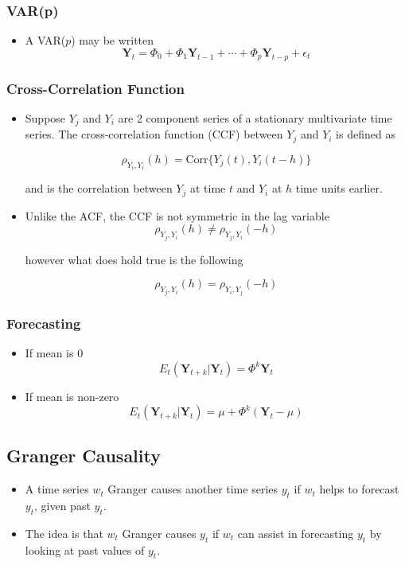 \documentclass[11pt]{article}
\begin{document}
\subsubsection{VAR(p)}
\begin{itemize}
    \item A VAR($p$) may be written 
    \[ 
    \boldsymbol{Y}_t = \Phi_0 + \Phi_1 \boldsymbol{Y}_{t-1} + \cdots + \Phi_p 
    \boldsymbol{Y}_{t-p} + \epsilon_t 
    \]
\end{itemize}

\subsubsection{Cross-Correlation Function}
\begin{itemize}
    \item Suppose $Y_j$ and $Y_i$ are 2 component series of a stationary multivariate time 
    series. The cross-correlation function (CCF) between $Y_j$ and $Y_i$ is defined as 

    \[ \rho_{Y_i, Y_i}(h) = \text{Corr}\{Y_j(t), Y_i(t-h)\} \]

    and is the correlation between $Y_j$ at time $t$ and $Y_i$ at $h$ time units earlier. 
    \item Unlike the ACF, the CCF is not symmetric in the lag variable 
    \[ \rho_{Y_j, Y_i}(h) \ne \rho_{Y_j, Y_i}(-h) \]
    
    however what does hold true is the following 

    \[ \rho_{Y_j, Y_i}(h) = \rho_{Y_i, Y_j}(-h) \]

\end{itemize}

\subsubsection{Forecasting}
\begin{itemize}
    \item If mean is 0 
    \[E_t(\boldsymbol{Y}_{t+k}|\boldsymbol{Y}_t) = \Phi^k \boldsymbol{Y}_t\]
    \item If mean is non-zero
    \[E_t(\boldsymbol{Y}_{t+k}|\boldsymbol{Y}_t) = \mu + \Phi^k (\boldsymbol{Y}_t - \mu) \]
\end{itemize}

\subsection{Granger Causality}
\begin{itemize}
    \item A time series $w_t$ Granger causes another time series $y_t$ if $w_t$ helps to 
    forecast $y_t$, given past $y_t$.
    \item The idea is that $w_t$ Granger causes $y_t$ if $w_t$ can assist in forecasting $y_t$
    by looking at past values of $y_t$.
    
\end{itemize}
\end{document}
